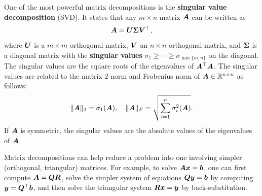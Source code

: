 One of the most powerful matrix decompositions is the \textbf{singular value decomposition} (SVD). It states that any $m\times n$ matrix $\bm{A}$ can be written as
\begin{equation*}
 \bm{A} = \bm{U}\bm{\Sigma}\bm{V}^{\top},
\end{equation*}
where $\bm{U}$ is a $m\times m$ orthogonal matrix, $\bm{V}$ an $n\times n$ orthogonal matrix, and $\bm{\Sigma}$ is a diagonal matrix with the \textbf{singular values} $\sigma_1\geq \cdots\geq \sigma_{\min\{m,n\}}$ on the diagonal. The singular values are the square roots of the eigenvalues of $\bm{A}^{\top}\bm{A}$. The singular values are related to the matrix $2$-norm and Frobenius norm of $\bm{A}\in \mathbb{R}^{n\times n}$ as follows:
\begin{equation*}
  \Vert {\bm{A}}\Vert_2 = \sigma_1(\bm{A}), \quad \Vert {\bm{A}}\Vert_F = \sqrt{\sum_{i=1}^n \sigma_i^2(\bm{A})}. 
\end{equation*}
If $\bm{A}$ is symmetric, the singular values are the absolute values of the eigenvalues of $\bm{A}$.

Matrix decompositions can help reduce a problem into one involving simpler (orthogonal, triangular) matrices. For example, to solve $\bm{A}\bm{x}=\bm{b}$, one can first compute $\bm{A}=\bm{Q}\bm{R}$, solve the simpler system of equations $\bm{Q}\bm{y}=\bm{b}$ by computing $\bm{y}=\bm{Q}^{\top}\bm{b}$, and then solve the triangular system $\bm{R}\bm{x}=\bm{y}$ by back-substitution. 

